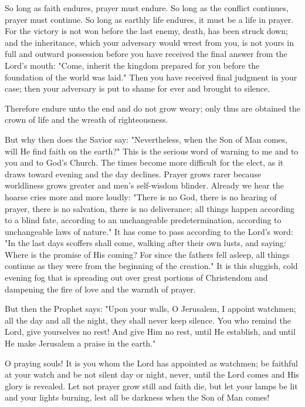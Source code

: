 So long as faith endures, prayer must endure. So long as the conflict continues, prayer must continue. So long as earthly life endures, it must be a life in prayer. For the victory is not won before the last enemy, death, has been struck down; and the inheritance, which your adversary would wrest from you, is not yours in full and outward possession before you have received the final answer from the Lord’s mouth: "Come, inherit the kingdom prepared for you before the foundation of the world was laid." Then you have received final judgment in your case; then your adversary is put to shame for ever and brought to silence.

Therefore endure unto the end and do not grow weary; only thus are obtained the crown of life and the wreath of righteousness.

But why then does the Savior say: "Nevertheless, when the Son of Man comes, will He find faith on the earth?" This is the serious word of warning to me and to you and to God’s Church. The times become more difficult for the elect, as it draws toward evening and the day declines. Prayer grows rarer because worldliness grows greater and men’s self-wisdom blinder. Already we hear the hoarse cries more and more loudly: "There is no God, there is no hearing of prayer, there is no salvation, there is no deliverance; all things happen according to a blind fate, according to an unchangeable predetermination, according to unchangeable laws of nature." It has come to pass according to the Lord’s word: "In the last days scoffers shall come, walking after their own lusts, and saying: Where is the promise of His coming? For since the fathers fell asleep, all things continue as they were from the beginning of the creation." It is this sluggish, cold evening fog that is spreading out over great portions of Christendom and dampening the fire of love and the warmth of prayer.

But then the Prophet says: "Upon your walls, O Jerusalem, I appoint watchmen; all the day and all the night, they shall never keep silence. You who remind the Lord, give yourselves no rest! And give Him no rest, until He establish, and until He make Jerusalem a praise in the earth."

O praying souls! It is you whom the Lord has appointed as watchmen; be faithful at your watch and be not silent day or night, never, until the Lord comes and His glory is revealed. Let not prayer grow still and faith die, but let your lamps be lit and your lights burning, lest all be darkness when the Son of Man comes!

